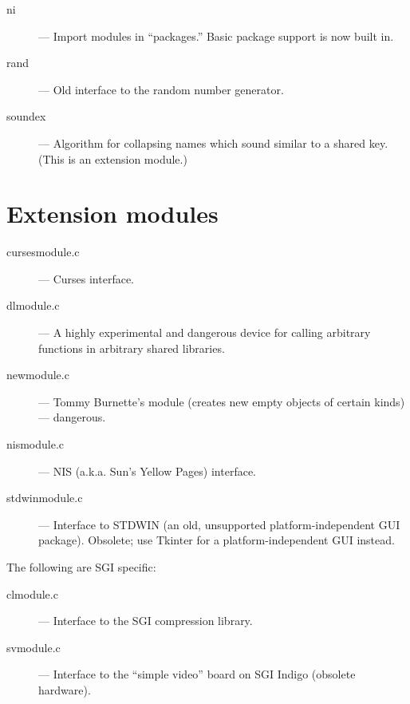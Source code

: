 \begin{description}
\item[ni]
--- Import modules in ``packages.''  Basic package support is now
built in.

\item[rand]
--- Old interface to the random number generator.

\item[soundex]
--- Algorithm for collapsing names which sound similar to a shared
key.  (This is an extension module.)
\end{description}


\section{Extension modules}

\begin{description}
\item[cursesmodule.c]
--- Curses interface.

\item[dlmodule.c]
---  A highly experimental and dangerous device for calling
arbitrary \C{} functions in arbitrary shared libraries.

\item[newmodule.c]
--- Tommy Burnette's  module (creates new empty objects of
certain kinds) --- dangerous.

\item[nismodule.c]
--- NIS (a.k.a. Sun's Yellow Pages) interface.

\item[stdwinmodule.c]
--- Interface to STDWIN (an old, unsupported
platform-independent GUI package).  Obsolete; use Tkinter for a
platform-independent GUI instead.
\end{description}

The following are SGI specific:

\begin{description}
\item[clmodule.c]
--- Interface to the SGI compression library.

\item[svmodule.c]
--- Interface to the ``simple video'' board on SGI Indigo
(obsolete hardware).
\end{description}
